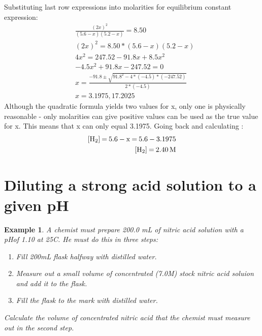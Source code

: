 \documentclass{article}  %
\newtheorem{exmp}{Example}
\begin{document}
\newline
Substituting last row expressions into molarities for equilibrium constant expression:
\begin{equation*}
    \begin{aligned}
        &\frac{(2x)^2}{(5.6-x)(5.2-x)} = 8.50 \\
        &(2x)^2 = 8.50*(5.6-x)(5.2-x) \\
        &4x^2 = 247.52 - 91.8x + 8.5x^2 \\
        &-4.5x^2 + 91.8x - 247.52 = 0 \\
        &x = \frac{-91.8\pm\sqrt{91.8^2-4*(-4.5)*(-247.52)}}{2*(-4.5)} \\
        &x = 3.1975, 17.2025
    \end{aligned}
\end{equation*}
Although the quadratic formula yields two values for x, only one is physically reasonable - only molarities can give positive values can be used as the true value for x. This means that x can only equal 3.1975. Going back and calculating :
\begin{equation*}
    \begin{aligned}
        \ce{[H2] = 5.6 - x = 5.6 - 3.1975} \\
        \ce{[H2] = 2.40M}
    \end{aligned}
\end{equation*}

\section*{Diluting a strong acid solution to a given pH}
\begin{exmp}
    A chemist must prepare 200.0 mL of nitric acid solution with a pHof 1.10 at 25C. He must do this in three steps:
    \begin{enumerate}
        \item Fill 200mL flask halfway with distilled water.
        \item Measure out a small volume of concentrated (7.0M) stock nitric acid soluion and add it to the flask.
        \item Fill the flask to the mark with distilled water.
    \end{enumerate}
    Calculate the volume of concentrated nitric acid that the chemist must measure out in the second step.
\end{exmp}
\end{document}
